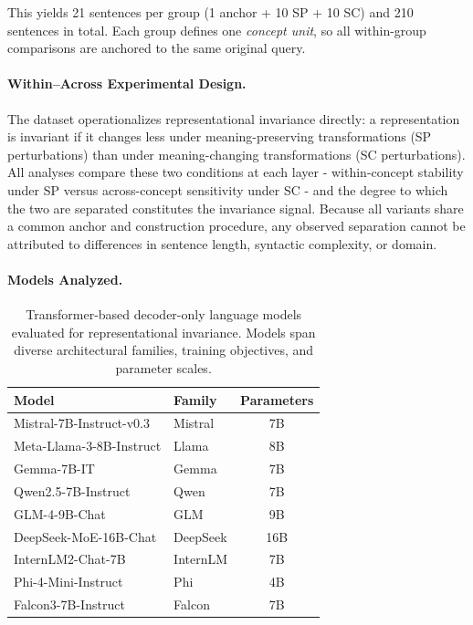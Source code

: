 
This yields 21 sentences per group (1 anchor + 10 SP + 10 SC) and 210 sentences in total. Each group defines one \textit{concept unit}, so all within-group comparisons are anchored to the same original query.

\paragraph{Within--Across Experimental Design.}
The dataset operationalizes representational invariance directly: a representation is invariant if it changes less under meaning-preserving transformations (SP perturbations) than under meaning-changing transformations (SC perturbations). All analyses compare these two conditions at each layer - within-concept stability under SP versus across-concept sensitivity under SC - and the degree to which the two are separated constitutes the invariance signal. Because all variants share a common anchor and construction procedure, any observed separation cannot be attributed to differences in sentence length, syntactic complexity, or domain.

\paragraph{Models Analyzed.}

\begin{table}[h]
\centering
\begin{tabular}{llc}
\toprule
\textbf{Model} & \textbf{Family} & \textbf{Parameters} \\
\midrule
Mistral-7B-Instruct-v0.3      & Mistral    & 7B \\
Meta-Llama-3-8B-Instruct      & Llama      & 8B \\
Gemma-7B-IT                   & Gemma      & 7B \\
Qwen2.5-7B-Instruct           & Qwen       & 7B \\
GLM-4-9B-Chat                 & GLM        & 9B \\
DeepSeek-MoE-16B-Chat         & DeepSeek   & 16B \\
InternLM2-Chat-7B             & InternLM   & 7B \\
Phi-4-Mini-Instruct           & Phi        & 4B \\
Falcon3-7B-Instruct           & Falcon     & 7B \\
\bottomrule
\end{tabular}
\caption{Transformer-based decoder-only language models evaluated for representational invariance. Models span diverse architectural families, training objectives, and parameter scales.}
\label{tab:models}
\vspace{-2.0em}
\end{table}

